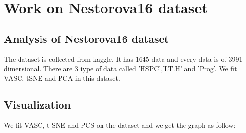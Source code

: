 \documentclass[12 pts]{article}
\begin{document}
\section{Work on Nestorova16 dataset}
\subsection{Analysis of Nestorova16 dataset}
The dataset is collected from kaggle. It has 1645 data and every data is of 3991 dimensional. There are 3 type of data called 'HSPC','LT.H' and 'Prog'. We fit VASC, tSNE and PCA in this dataset.

\subsection{Visualization}
We fit VASC, t-SNE and PCS on the dataset and we get the graph as follow:
\end{document}

